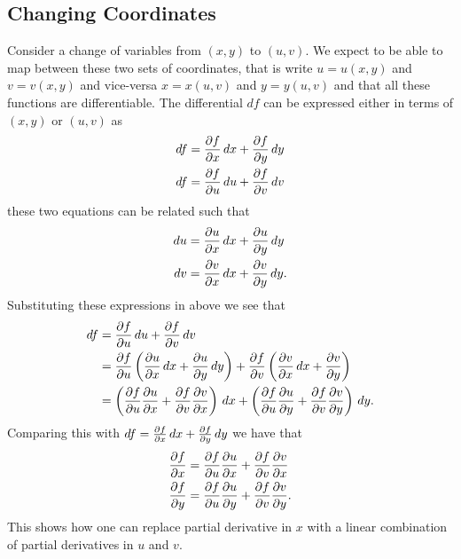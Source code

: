 \documentclass[10pt, a4paper]{article}
\begin{document}
\subsection{Changing Coordinates}

Consider a change of variables from $(x, y)$ to $(u, v)$.
We expect to be able to map between these two sets of coordinates,
that is write $u = u(x, y)$ and $v = v(x, y)$ and vice-versa $x = x(u, v)$ and $y = y(u, v)$ and that all these functions are differentiable.
The differential $df$ can be expressed either in terms of $(x, y)$ or $(u, v)$ as
\begin{align*}
    df &= \pd[f]{x}\,dx + \pd[f]{y}\,dy \\
    df &= \pd[f]{u}\,du + \pd[f]{v}\,dv
\end{align*}
these two equations can be related such that
\begin{align*}
    du &= \pd[u]{x}\,dx + \pd[u]{y}\,dy \\
    dv &= \pd[v]{x}\,dx + \pd[v]{y}\,dy.
\end{align*}
Substituting these expressions in above we see that
\begin{align*}
    df &= \pd[f]{u}\,du + \pd[f]{v}\,dv \\
    &= \pd[f]{u}\left(\pd[u]{x}\,dx + \pd[u]{y}\,dy\right) + \pd[f]{v}\left(\pd[v]{x}\,dx + \pd[v]{y}\right) \\
    &= \left(\pd[f]{u}\pd[u]{x} + \pd[f]{v}\pd[v]{x}\right)\,dx + \left(\pd[f]{u}\pd[u]{y} + \pd[f]{v}\pd[v]{y}\right)\,dy.
\end{align*}
Comparing this with $df = \pd[f]{x}\,dx + \pd[f]{y}\,dy$ we have that
\begin{align*}
    \pd[f]{x} &= \pd[f]{u}\pd[u]{x} + \pd[f]{v}\pd[v]{x} \\
    \pd[f]{y} &= \pd[f]{u}\pd[u]{y} + \pd[f]{v}\pd[v]{y}.
\end{align*}
This shows how one can replace partial derivative in $x$ with a linear combination of partial derivatives in $u$ and $v$.
\end{document}
